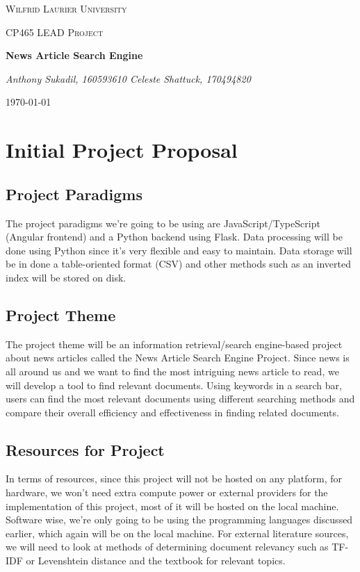 \documentclass{article}
\begin{document}
\begin{titlepage}
	\begin{center}
	{\scshape\LARGE Wilfrid Laurier University\par}
	{\scshape \LARGE CP465 LEAD Project \par}
	\vspace{1cm}
	{\huge\bfseries News Article Search Engine\par}
	\vspace{1cm}
	{\Large\itshape \raggedleft Anthony Sukadil, 160593610 \newline Celeste Shattuck, 170494820 \newline\par}		
	\vspace{1cm}
	{\large \today\par}
	\end{center}
\end{titlepage}
\section{Initial Project Proposal}
\subsection{Project Paradigms}
The project paradigms we’re going to be using are JavaScript/TypeScript (Angular frontend) and a Python backend using Flask. Data processing will be done using Python since it’s very flexible and easy to maintain. Data storage will be in done a table-oriented format (CSV) and other methods such as an inverted index will be stored on disk.
\subsection{Project Theme}
The project theme will be an information retrieval/search engine-based project about news articles called the News Article Search Engine Project. Since news is all around us and we want to find the most intriguing news article to read, we will develop a tool to find relevant documents. Using keywords in a search bar, users can find the most relevant documents using different searching methods and compare their overall efficiency and effectiveness in finding related documents.
\subsection{Resources for Project}
In terms of resources, since this project will not be hosted on any platform, for hardware, we won’t need extra compute power or external providers for the implementation of this project, most of it will be hosted on the local machine. Software wise, we’re only going to be using the programming languages discussed earlier, which again will be on the local machine. \newline \newline
For external literature sources, we will need to look at methods of determining document relevancy such as TF-IDF or Levenshtein distance and the textbook for relevant topics.
\end{document}
